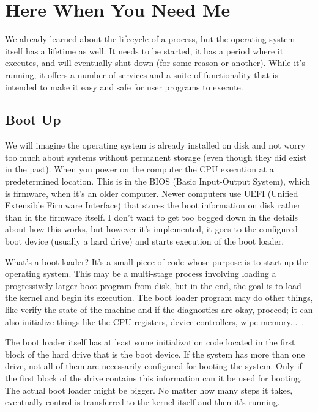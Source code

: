 




\section*{Here When You Need Me}

We already learned about the lifecycle of a process, but the operating system itself has a lifetime as well. It needs to be started, it has a period where it executes, and will eventually shut down (for some reason or another). While it's running, it offers a number of services and a suite of functionality that is intended to make it easy and safe for user programs to execute.

\subsection*{Boot Up}
We will imagine the operating system is already installed on disk and not worry too much about systems without permanent storage (even though they did exist in the past). When you power on the computer the CPU execution at a predetermined location. This is in the BIOS (Basic Input-Output System), which is firmware, when it's an older computer. Newer computers use  UEFI (Unified Extensible Firmware Interface) that stores the boot information on disk rather than in the firmware itself. I don't want to get too bogged down in the details about how this works, but however it's implemented, it goes to the configured boot device (usually a hard drive)  and starts execution of the boot loader. 

What's a boot loader? It's a small piece of code whose purpose is to start up the operating system. This may be a multi-stage process involving loading a progressively-larger boot program from disk, but in the end, the goal is to load the kernel and begin its execution. The boot loader program may do other things, like verify the state of the machine and if the diagnostics are okay, proceed; it can also initialize things like the CPU registers, device controllers, wipe memory...~\cite{osc}.

The boot loader itself has at least some initialization code located in the first block of the hard drive that is the boot device. If the system has more than one drive, not all of them are necessarily configured for booting the system. Only if the first block of the drive contains this information can it be used for booting. The actual boot loader might be bigger. No matter how many steps it takes, eventually control is transferred to the kernel itself and then it's running.

